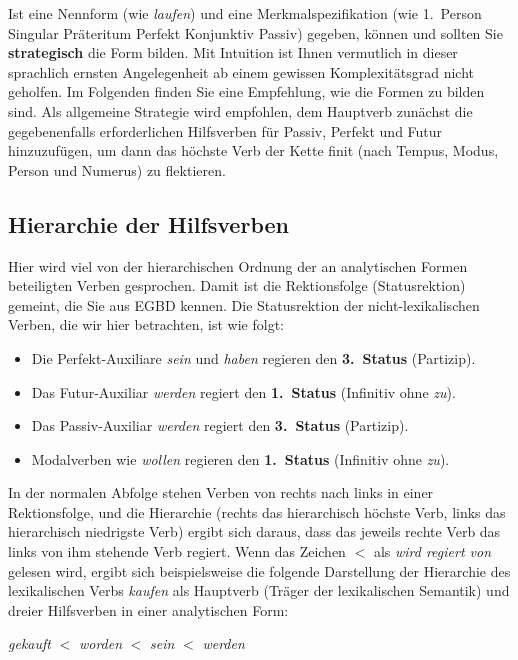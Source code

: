 Ist eine Nennform (wie \textit{laufen}) und eine Merkmalspezifikation (wie 1.~Person Singular Präteritum Perfekt Konjunktiv Passiv) gegeben, können und sollten Sie \textbf{strategisch} die Form bilden.
Mit Intuition ist Ihnen vermutlich in dieser sprachlich ernsten Angelegenheit ab einem gewissen Komplexitätsgrad nicht geholfen.
Im Folgenden finden Sie eine Empfehlung, wie die Formen zu bilden sind.
Als allgemeine Strategie wird empfohlen, dem Hauptverb zunächst die gegebenenfalls erforderlichen Hilfsverben für Passiv, Perfekt und Futur hinzuzufügen, um dann das höchste Verb der Kette finit (nach Tempus, Modus, Person und Numerus) zu flektieren.

\subsection{Hierarchie der Hilfsverben}

Hier wird viel von der hierarchischen Ordnung der an analytischen Formen beteiligten Verben gesprochen.
Damit ist die Rektionsfolge (Statusrektion) gemeint, die Sie aus EGBD kennen.
Die Statusrektion der nicht-lexikalischen Verben, die wir hier betrachten, ist wie folgt:

\begin{itemize}\Lf
  \item Die Perfekt-Auxiliare \textit{sein} und \textit{haben} regieren den \textbf{3.~Status} (Partizip).
  \item Das Futur-Auxiliar \textit{werden} regiert den \textbf{1.~Status} (Infinitiv ohne \textit{zu}).
  \item Das Passiv-Auxiliar \textit{werden} regiert den \textbf{3.~Status} (Partizip).
  \item Modalverben wie \textit{wollen} regieren den \textbf{1.~Status} (Infinitiv ohne \textit{zu}).
\end{itemize}

In der normalen Abfolge stehen Verben von rechts nach links in einer Rektionsfolge, und die Hierarchie (rechts das hierarchisch höchste Verb, links das hierarchisch niedrigste Verb) ergibt sich daraus, dass das jeweils rechte Verb das links von ihm stehende Verb regiert.
Wenn das Zeichen $<$ als \textit{wird regiert von} gelesen wird, ergibt sich beispielsweise die folgende Darstellung der Hierarchie des lexikalischen Verbs \textit{kaufen} als Hauptverb (Träger der lexikalischen Semantik) und dreier Hilfsverben in einer analytischen Form:

\begin{center}
  \textit{gekauft} $<$ \textit{worden} $<$ \textit{sein} $<$ \textit{werden}
\end{center}

